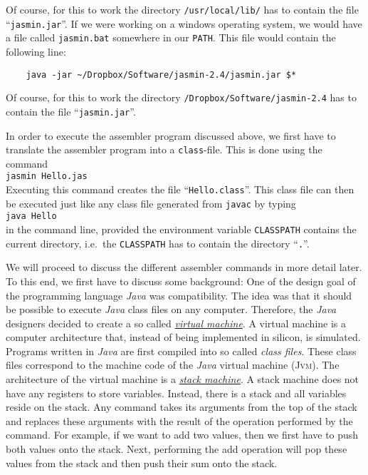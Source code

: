 Of course, for this to work the directory \texttt{/usr/local/lib/} has to contain the file
``\texttt{jasmin.jar}''.  If we were working on a windows operating system, we would have a file
called \texttt{jasmin.bat} somewhere in our \texttt{PATH}.  This file would contain the following
line:
\begin{verbatim}
    java -jar ~/Dropbox/Software/jasmin-2.4/jasmin.jar $*
\end{verbatim}
Of course, for this to work the directory \texttt{/Dropbox/Software/jasmin-2.4} has to
contain the file ``\texttt{jasmin.jar}''.

In order to execute the assembler program discussed above, we first have to translate the assembler
program into a \texttt{class}-file.  This is done using the command
\\[0.2cm]
\hspace*{1.3cm}
\texttt{jasmin Hello.jas}
\\[0.2cm]
Executing this command creates the file ``\texttt{Hello.class}''.  This class file
can then be executed just like any class file generated from \texttt{javac} by typing
\\[0.2cm]
\hspace*{1.3cm}
\texttt{java Hello}
\\[0.2cm]
in the command line, provided the environment variable \texttt{CLASSPATH} contains the current
directory, i.e.~the \texttt{CLASSPATH} has to contain the directory ``\texttt{.}''.

We will proceed to discuss the different assembler commands in more detail later.  To this end, we
first have to discuss some background: One of the design goal of the programming language
\textsl{Java} was compatibility.  The idea was 
that it should be possible to execute \textsl{Java} class files on any computer.  Therefore, the
\textsl{Java} designers decided to create a so called 
\href{http://en.wikipedia.org/wiki/Virtual_machine}{\emph{virtual machine}}.  A virtual machine is
a computer architecture that, instead of being implemented in silicon, is simulated. 
Programs written in \textsl{Java} are first compiled into so called \emph{class files}.  These class
files correspond to the machine code of the \textsl{Java} virtual machine (\textsc{Jvm}).  
The architecture of the virtual machine is a 
\href{http://en.wikipedia.org/wiki/Stack_machine}{\emph{stack machine}}. 
A stack machine does not have any registers to store variables.  Instead, there is a stack and all
variables reside on the stack.  Any command takes its arguments from the top of the stack and
replaces these arguments with the result of the operation performed by the command.
For example, if we want to add two values, then we first have to
push both values onto the stack.  Next, performing the add operation will pop these values from the
stack and then push their sum onto the stack.


